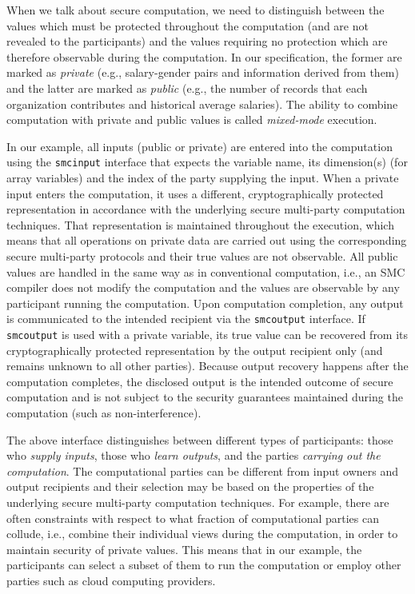 When we talk about secure computation, we need to distinguish between the values which must be protected throughout the computation (and are not revealed to the participants) and the values requiring no protection which are therefore observable during the computation. In our specification, the former are marked as \emph{private} (e.g., salary-gender pairs and information derived from them) and the latter are marked as \emph{public} (e.g., the number of records that each organization contributes and historical average salaries). The ability to combine computation with private and public values is called \emph{mixed-mode} execution.

In our example, all inputs (public or private) are entered into the computation using the \texttt{smcinput} interface that expects the variable name, its dimension(s) (for array variables) and the index of the party supplying the input. When a private input enters the computation, it uses a different, cryptographically protected representation in accordance with the underlying secure multi-party computation techniques. That representation is maintained throughout the execution, which means that all operations on private data are carried out using the corresponding secure multi-party protocols and their true values are not observable. All public values are handled in the same way as in conventional computation, i.e., an SMC compiler does not modify the computation and the values are observable by any participant running the computation. Upon computation completion, any output is communicated to the intended recipient via the \texttt{smcoutput} interface. If \texttt{smcoutput} is used with a private variable, its true value can be recovered from its cryptographically protected representation by the output recipient only (and remains unknown to all other parties). Because output recovery happens after the computation completes, the disclosed output is the intended outcome of secure computation and is not subject to the security guarantees maintained during the computation (such as non-interference). 

The above interface distinguishes between different types of participants: those who \emph{supply inputs}, those who \emph{learn outputs}, and the parties \emph{carrying out the computation}. The computational parties can be different from input owners and output recipients and their selection may be based on the properties of the underlying secure multi-party computation techniques. For example, there are often constraints with respect to what fraction of computational parties can collude, i.e., combine their individual views during the computation, in order to maintain security of private values. This means that in our example, the participants can select a subset of them to run the computation or employ other parties such as cloud computing providers.

